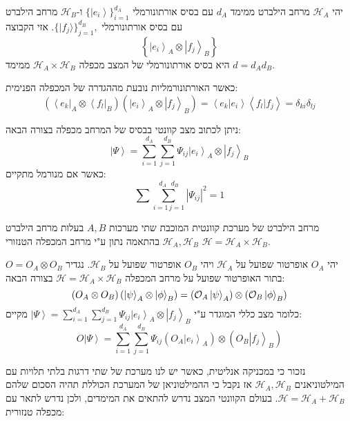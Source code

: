 \documentclass{tstextbook}
\begin{document}
\begin{proposition}
יהי \(\mathcal{H}_{A}\) מרחב הילברט ממימד \(d_{A}\) עם בסיס אורתונורמלי \(\{\left|e_{i}\right\rangle\}_{i=1}^{d_{A}}\) ו-\(\mathcal{H}_{B}\) מרחב הילברט עם בסיס אורתונורמלי \(\bigl\{\bigl|f_{j}\bigr\rangle\bigr\}_{j=1}^{d_{B}},\). אזי הקבוצה
$$\left\{\left|e_{i}\right\rangle_{A}\otimes\left|f_{j}\right\rangle_{B}\right\}$$
היא בסיס אורתונורמלי של המצב מכפלה \(\mathcal{H}_{A}\times \mathcal{H}_{B}\) ממימד \(d=d_{A}d_{B}\).

\end{proposition}
כאשר האורתונורמליות נובעת מההגדרה של המכפלה הפנימית:
$$\left(\left\langle e_{k}\right|_{A}\otimes\left\langle f_{l}\right|_{B}\right)\left(\left|e_{i}\right\rangle_{A}\otimes\left|f_{j}\right\rangle_{B}\right)=\left\langle e_{k}|e_{i}\right\rangle\left\langle f_{l}|f_{j}\right\rangle=\delta_{k i}\delta_{l j}$$

\begin{corollary}
ניתן לכתוב מצב קוונטי בבסיס של המרחב מכפלה בצורה הבאה:
$$\left|\Psi\right\rangle=\sum_{i=1}^{d_{A}}\sum_{j=1}^{d_{B}}\Psi_{i j}\left|e_{i}\right\rangle_{A}\otimes\left|f_{j}\right\rangle_{B}$$
כאשר אם מנורמל מתקיים:
$$\sum\sum_{i=1\,j=1}^{d_{A}\,\,\,\,d_{B}}|\Psi_{i j}|^{2}=1$$

\end{corollary}
\begin{theorem}
מרחב הילברט של מערכת קוונטית המוכבת שתי מערכות \(A,B\) בעלות מרחב הילברט \(\mathcal{H}_{A},\mathcal{H}_{B}\) בהתאמה נתון ע"י מרחב המכפלה הטנזורי \(\mathcal{H}=\mathcal{H}_{A}\times \mathcal{H}_{B}\).

\end{theorem}
\begin{definition}
יהי \(O_{A}\) אופרטור שפועל על \(\mathcal{H}_{A}\) ויהי \(O_{B}\) אופרטור שפועל על \(\mathcal{H}_{B}\). נגדיר \(O=O_{A}\otimes O_{B}\) בתור האופרטור שפועל על מרחב המכפלה \(\mathcal{H}=\mathcal{H}_{A}\times \mathcal{H}_{B}\) בצורה הבאה:
$$\left({ O}_{A}\otimes{ O}_{B}\right)\left(\left|\psi\right\rangle_{A}\otimes\left|\phi\right\rangle_{B}\right)=\left({\cal O}_{A}\left|\psi\right\rangle_{A}\right)\otimes\left({\cal O}_{B}\left|\phi\right\rangle_{B}\right)$$
כלומר מצב כללי המוגדר ע"י \(\left|\Psi\right\rangle=\sum_{i=1}^{d_{A}}\sum_{j=1}^{d_{B}}\Psi_{i j}\left|e_{i}\right\rangle_{A}\otimes\left|f_{j}\right\rangle_{B}\) מקיים:
$${ O}\left|\Psi\right\rangle=\sum_{i=1}^{d_{A}}\sum_{j=1}^{d_{B}}\Psi_{i j}\left({ O}_{A}\left|e_{i}\right\rangle_{A}\right)\otimes\left({ O}_{B}\left|f_{j}\right\rangle_{B}\right)$$

\end{definition}
נזכור כי במכניקה אנליטית, כאשר יש לנו מערכת של שתי דרגות בלתי תלויות עם המילטוניאנים \(\mathcal{H}_{A},\mathcal{H}_{B}\) אז נקבל כי ההמילטוניאן של המערכת הכוללת תהיה הסכום שלהם \(\mathcal{H}=\mathcal{H}_{A}+\mathcal{H}_{B}\). בעולם הקוונטי המצב נדרש להתאים את המימדים, ולכן נדרש לתאר עם מכפלה טנזורית:
\end{document}
